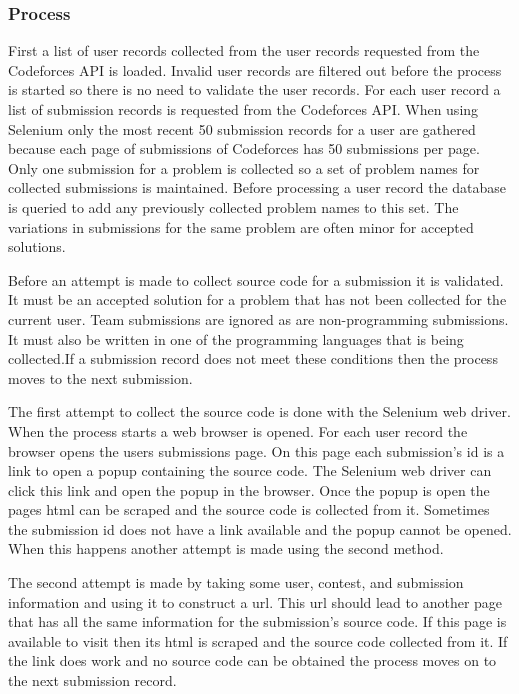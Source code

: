 \documentclass{article}
\begin{document}
\subsubsection*{Process}
First a list of user records collected from the user records requested from the Codeforces API is loaded. Invalid user records are filtered out before the process is started so there is no need to validate the user records. For each user record a list of submission records is requested from the Codeforces API. When using Selenium only the most recent 50 submission records for a user are gathered because each page of submissions of Codeforces has 50 submissions per page. Only one submission for a problem is collected so a set of problem names for collected submissions is maintained. Before processing a user record the database is queried to add any previously collected problem names to this set.  The variations in submissions for the same problem are often minor for accepted solutions.

Before an attempt is made to collect source code for a submission it is validated. It must be an accepted solution for a problem that has not been collected for the current user. Team submissions are ignored as are non-programming submissions. It must also be written in one of the programming languages that is being collected.If a submission record does not meet these conditions then the process moves to the next submission.

The first attempt to collect the source code is done with the Selenium web driver. When the process starts a web browser is opened. For each user record the browser opens the users submissions page. On this page each submission's id is a link to open a popup containing the source code. The Selenium web driver can click this link and open the popup in the browser. Once the popup is open the pages html can be scraped and the source code is collected from it. Sometimes the submission id does not have a link available and the popup cannot be opened. When this happens another attempt is made using the second method.

The second attempt is made by taking some user, contest, and submission information and using it to construct a url. This url should lead to another page that has all the same information for the submission's source code. If this page is available to visit then its html is scraped and the source code collected from it. If the link does work and no source code can be obtained the process moves on to the next submission record.
\end{document}
